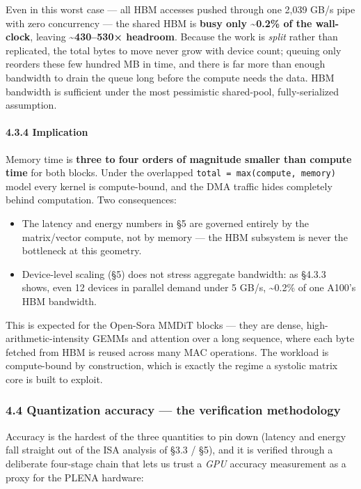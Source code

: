 \documentclass[
  10pt,
]{article}
\providecommand{\tightlist}{%
  \setlength{\itemsep}{0pt}\setlength{\parskip}{0pt}}
\begin{document}
Even in this worst case --- all HBM accesses pushed through one 2,039
GB/s pipe with zero concurrency --- the shared HBM is \textbf{busy only
\textasciitilde0.2\% of the wall-clock}, leaving
\textbf{\textasciitilde430--530× headroom}. Because the work is
\emph{split} rather than replicated, the total bytes to move never grow
with device count; queuing only reorders these few hundred MB in time,
and there is far more than enough bandwidth to drain the queue long
before the compute needs the data. HBM bandwidth is sufficient under the
most pessimistic shared-pool, fully-serialized assumption.

\paragraph{4.3.4 Implication}\label{implication}

Memory time is \textbf{three to four orders of magnitude smaller than
compute time} for both blocks. Under the overlapped
\texttt{total\ =\ max(compute,\ memory)} model every kernel is
compute-bound, and the DMA traffic hides completely behind computation.
Two consequences:

\begin{itemize}
\tightlist
\item
  The latency and energy numbers in §5 are governed entirely by the
  matrix/vector compute, not by memory --- the HBM subsystem is never
  the bottleneck at this geometry.
\item
  Device-level scaling (§5) does not stress aggregate bandwidth: as
  §4.3.3 shows, even 12 devices in parallel demand under 5 GB/s,
  \textasciitilde0.2\% of one A100's HBM bandwidth.
\end{itemize}

This is expected for the Open-Sora MMDiT blocks --- they are dense,
high-arithmetic-intensity GEMMs and attention over a long sequence,
where each byte fetched from HBM is reused across many MAC operations.
The workload is compute-bound by construction, which is exactly the
regime a systolic matrix core is built to exploit.

\subsubsection{4.4 Quantization accuracy --- the verification
methodology}\label{quant-accuracy-methodology}

Accuracy is the hardest of the three quantities to pin down (latency and
energy fall straight out of the ISA analysis of §3.3 / §5), and it is
verified through a deliberate four-stage chain that lets us trust a
\emph{GPU} accuracy measurement as a proxy for the PLENA hardware:
\end{document}
